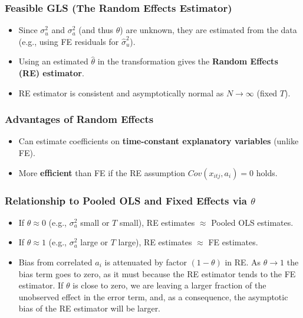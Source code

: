 \documentclass[a4paper, 10pt]{article}
\theoremstyle{definition}	%
\begin{document}
\subsubsection{Feasible GLS (The Random Effects Estimator)}
\begin{itemize}
    \item Since \(\sigma_u^2\) and \(\sigma_a^2\) (and thus \(\theta\)) are unknown, they are estimated from the data (e.g., using FE residuals for \(\hat{\sigma}_u^2\)).
    \item Using an estimated \(\hat{\theta}\) in the transformation gives the \textbf{Random Effects (RE) estimator}.
    \item RE estimator is consistent and asymptotically normal as \(N \to \infty\) (fixed \(T\)).
\end{itemize}

\subsubsection{Advantages of Random Effects}
\begin{itemize}
    \item Can estimate coefficients on \textbf{time-constant explanatory variables} (unlike FE).
    \item More \textbf{efficient} than FE if the RE assumption \(Cov(x_{itj}, a_i)=0\) holds.
\end{itemize}

\subsubsection{Relationship to Pooled OLS and Fixed Effects via \(\theta\)}
\begin{itemize}
    \item If \(\theta \approx 0\) (e.g., \(\sigma_a^2\) small or \(T\) small), RE estimates \(\approx\) Pooled OLS estimates.
    \item If \(\theta \approx 1\) (e.g., \(\sigma_a^2\) large or \(T\) large), RE estimates \(\approx\) FE estimates.
    \item Bias from correlated \(a_i\) is attenuated by factor \((1-\theta)\) in RE. As $\theta \rightarrow 1 $ the bias term goes to zero, as it must because the RE estimator tends to the FE estimator. If $\theta$ is close to zero, we are leaving a larger fraction of the unobserved effect in the error term, and, as a consequence, the asymptotic bias of the RE estimator will be larger.
\end{itemize}
\end{document}

